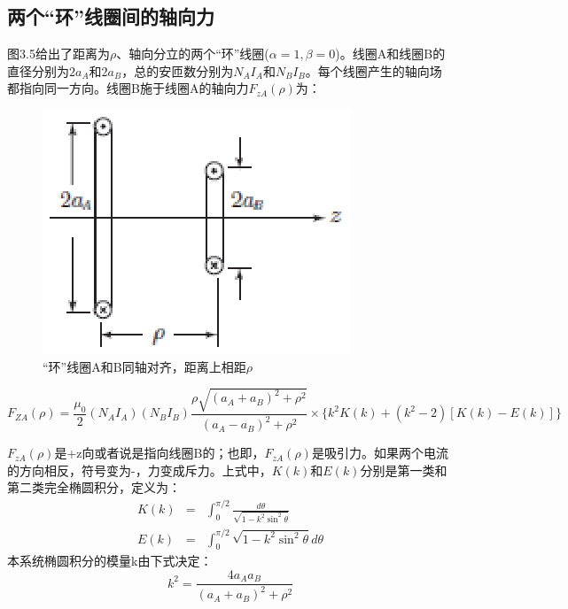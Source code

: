 \subsection{两个“环”线圈间的轴向力}
图3.5给出了距离为$\rho$、轴向分立的两个“环”线圈($\alpha=1,\beta=0$)。线圈A和线圈B的直径分别为$2a_A$和$2a_B$，总的安匝数分别为$N_A I_A$和$N_B I_B$。每个线圈产生的轴向场都指向同一方向。线圈B施于线圈A的轴向力$F_{zA}(\rho)$为：
\begin{figure}[htbp]
	\centering
	\includegraphics[scale=1]{chpt3/figs/fig3.5.eps}
	\caption{“环”线圈A和B同轴对齐，距离上相距$\rho$}
\end{figure}

\begin{equation}
  F_{ZA}(\rho)=\frac{\mu_0}{2}(N_A I_A)(N_B I_B)\frac{\rho\sqrt{(a_A+a_B)^2+\rho^2}}{(a_A-a_B)^2+\rho^2}\times\{k^2 K(k)+(k^2-2)[K(k)-E(k)]\}
\end{equation}

$F_{zA}(\rho)$是+z向或者说是指向线圈B的；也即，$F_{zA}(\rho)$是吸引力。如果两个电流的方向相反，符号变为-，力变成斥力。上式中，$K(k)$和$E(k)$分别是第一类和第二类完全椭圆积分，定义为：
\begin{eqnarray}
  K(k) &=& \int_{0}^{\pi/2} \frac{d\theta}{\sqrt{1-k^2\sin^2\theta}} \\ \nonumber
  E(k)&=& \int_{0}^{\pi/2}\sqrt{1-k^2 \sin^2\theta}d\theta
\end{eqnarray}
本系统椭圆积分的模量k由下式决定：
\begin{equation}
  k^2=\frac{4a_A a_B}{(a_A+a_B)^2+\rho^2}
\end{equation}



